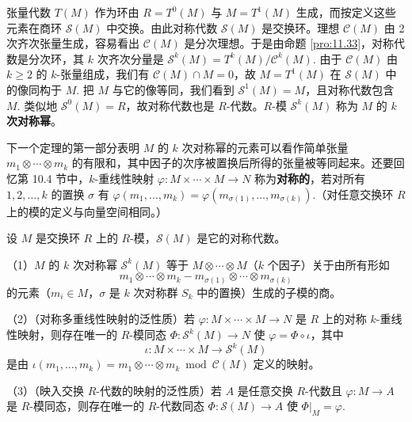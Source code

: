 张量代数 \(T(M)\) 作为环由 \(R = T^0(M)\) 与 \(M = T^1(M)\) 生成，而按定义这些元素在商环 \(\mathcal{S}(M)\) 中交换。由此对称代数 \(\mathcal{S}(M)\) 是交换环。理想 \(\mathcal{C}(M)\) 由 2 次齐次张量生成，容易看出 \(\mathcal{C}(M)\) 是分次理想。于是由命题 \ref{pro:11.33}，对称代数是分次环，其 \(k\) 次齐次分量是 \(\mathcal{S}^k(M) = T^k(M)/\mathcal{C}^k(M)\). 由于 \(\mathcal{C}(M)\) 由 \(k \geq 2\) 的 \(k\)-张量组成，我们有 \(\mathcal{C}(M) \cap M = 0\)，故 \(M = T^1(M)\) 在 \(\mathcal{S}(M)\) 中的像同构于 \(M\). 把 \(M\) 与它的像等同，我们看到 \(\mathcal{S}^1(M) = M\)，且对称代数包含 \(M\). 类似地 \(\mathcal{S}^0(M) = R\)，故对称代数也是 \(R\)-代数。\(R\)-模 \(\mathcal{S}^k(M)\) 称为 \(M\) 的 \textbf{\(k\) 次对称幂}。

下一个定理的第一部分表明 \(M\) 的 \(k\) 次对称幂的元素可以看作简单张量 \(m_1 \otimes \cdots \otimes m_k\) 的有限和，其中因子的次序被置换后所得的张量被等同起来。还要回忆第 10.4 节中，\(k\)-重线性映射 \(\varphi : M \times \cdots \times M \to N\) 称为\textbf{对称的}，若对所有 \(1, 2, \ldots, k\) 的置换 \(\sigma\) 有 \(\varphi(m_1, \ldots, m_k) = \varphi(m_{\sigma(1)}, \ldots, m_{\sigma(k)})\).（对任意交换环 \(R\) 上的模的定义与向量空间相同。）

\begin{theorem}\label{thm:11.34}
设 \(M\) 是交换环 \(R\) 上的 \(R\)-模，\(\mathcal{S}(M)\) 是它的对称代数。

（1）\(M\) 的 \(k\) 次对称幂 \(\mathcal{S}^k(M)\) 等于 \(M \otimes \cdots \otimes M\)（\(k\) 个因子）关于由所有形如
\[
m_1 \otimes \cdots \otimes m_k - m_{\sigma(1)} \otimes \cdots \otimes m_{\sigma(k)}
\]
的元素（\(m_i \in M\)，\(\sigma\) 是 \(k\) 次对称群 \(S_k\) 中的置换）生成的子模的商。

（2）（对称多重线性映射的泛性质）若 \(\varphi : M \times \cdots \times M \to N\) 是 \(R\) 上的对称 \(k\)-重线性映射，则存在唯一的 \(R\)-模同态 \(\Phi : \mathcal{S}^k(M) \to N\) 使 \(\varphi = \Phi \circ \iota\)，其中
\[
\iota : M \times \cdots \times M \to \mathcal{S}^k(M)
\]
是由 \(\iota(m_1, \ldots, m_k) = m_1 \otimes \cdots \otimes m_k \bmod \mathcal{C}(M)\) 定义的映射。

（3）（映入交换 \(R\)-代数的映射的泛性质）若 \(A\) 是任意交换 \(R\)-代数且 \(\varphi : M \to A\) 是 \(R\)-模同态，则存在唯一的 \(R\)-代数同态 \(\Phi : \mathcal{S}(M) \to A\) 使 \(\Phi|_M = \varphi\).
\end{theorem}

